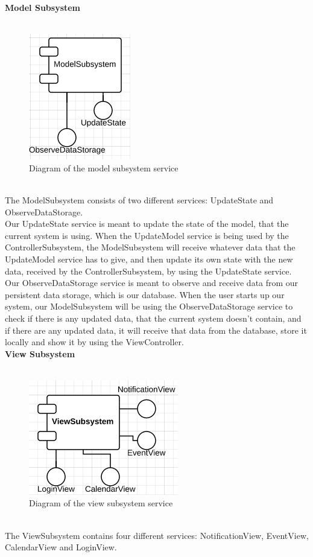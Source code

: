 \textbf{Model Subsystem}\\\\
\begin{figure}[h!]
	\centering
		\includegraphics[scale=0.8]{ModelServices}
	\caption{Diagram of the model subsystem service}
  \label{fig:ModelService}
\end{figure}\\
The ModelSubsystem consists of two different services: UpdateState and ObserveDataStorage.\\

Our UpdateState service is meant to update the state of the model, that the current system is using. When the UpdateModel service is being used by the ControllerSubsystem, the ModelSubsystem will receive whatever data that the UpdateModel service has to give, and then update its own state with the new data, received by the ControllerSubsystem, by using the UpdateState service.\\

Our ObserveDataStorage service is meant to observe and receive data from our persistent data storage, which is our database. When the user starts up our system, our ModelSubsystem will be using the ObserveDataStorage service to check if there is any updated data, that the current system doesn't contain, and if there are any updated data, it will receive that data from the database, store it locally and show it by using the ViewController.\\

\textbf{View Subsystem}\\\\
\begin{figure}[h!]
	\centering
		\includegraphics[scale=0.8]{ViewServices}
		\caption{Diagram of the view subsystem service}
  \label{fig:ViewService}
\end{figure}\\
The ViewSubsystem contains four different services: NotificationView, EventView, CalendarView and LoginView.\\

